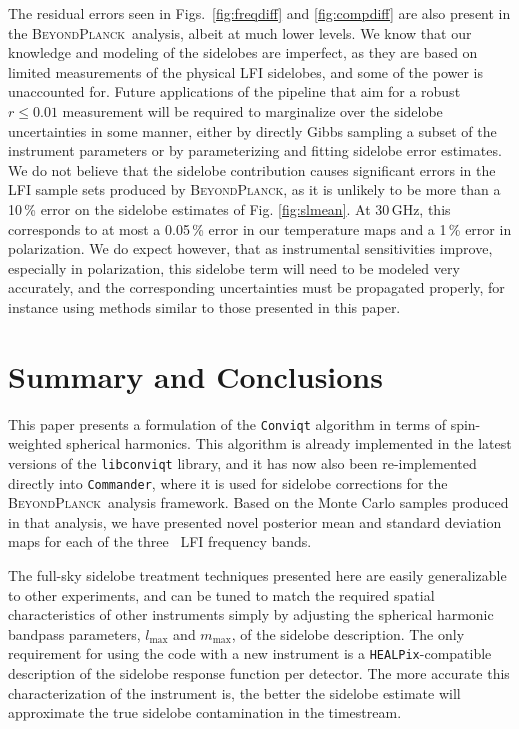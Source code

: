 \documentclass[twocolumn]{aa}
\def\healpix{\texttt{HEALPix}}
\def\commander{\texttt{Commander}}
\newcommand{\BP}{\textsc{BeyondPlanck}}
\begin{document}
The residual errors seen in Figs.~\ref{fig:freqdiff} and \ref{fig:compdiff} are also present in the \BP\ analysis, albeit at much lower levels. We know that our knowledge and modeling of the sidelobes are imperfect, as they are based on limited measurements of the physical LFI sidelobes, and some of the power is unaccounted for. Future applications of the pipeline that aim for a robust $r\le 0.01$ measurement will be required to marginalize over the sidelobe uncertainties in some manner, either by directly Gibbs sampling a subset of the instrument parameters or by parameterizing and fitting sidelobe error estimates. We do not believe that the sidelobe contribution causes significant errors in the LFI sample sets produced by \BP, as it is unlikely to be more than a 10\,\% error on the sidelobe estimates of Fig. \ref{fig:slmean}. At 30\,GHz, this corresponds to at most a 0.05\,\% error in our temperature maps and a 1\,\% error in polarization. We do expect however, that as instrumental sensitivities improve, especially in polarization, this sidelobe term will need to be modeled very accurately, and the corresponding uncertainties must be propagated properly, for instance using methods similar to those presented in this paper.

\section{Summary and Conclusions}
\label{sec:conclusions}

This paper presents a formulation of the \texttt{Conviqt} algorithm in terms of spin-weighted spherical harmonics. This algorithm is already implemented in the latest versions of the \texttt{libconviqt} library, and it has now also been re-implemented directly into \commander, where it is used for sidelobe corrections for the \BP\ analysis framework. Based on the Monte Carlo samples produced in that analysis, we have presented novel posterior mean and standard deviation maps for each of the three \Planck\ LFI frequency bands.

The full-sky sidelobe treatment techniques presented here are easily generalizable to other experiments, and can be tuned to match the required spatial characteristics of other instruments simply by adjusting the spherical harmonic bandpass parameters, $l_\mathrm{max}$ and $m_\mathrm{max}$, of the sidelobe description. The only requirement for using the code with a new instrument is a \healpix-compatible description of the sidelobe response function per detector. The more accurate this characterization of the instrument is, the better the sidelobe estimate will approximate the true sidelobe contamination in the timestream.
\end{document}
